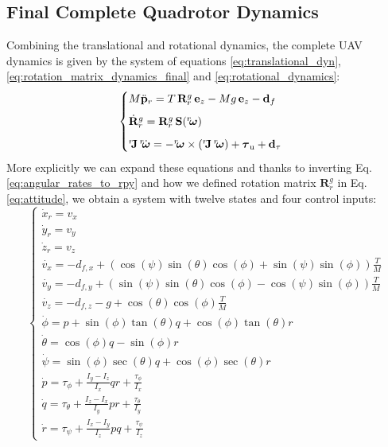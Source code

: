 \subsection{Final Complete Quadrotor Dynamics}
Combining the translational and rotational dynamics, the complete UAV dynamics is given by the system of equations
\ref{eq:translational_dyn}, \ref{eq:rotation_matrix_dynamics_final} and \ref{eq:rotational_dynamics}:
\begin{equation}
\begin{cases}
    M \ddot{\mathbf{p}}_r = T \, \mathbf{R}_r^g \, \mathbf{e}_z - M g \, \mathbf{e}_z - \mathbf{d}_f \\[6pt]
    \dot{\mathbf{R}}_r^g = \mathbf{R}_r^g \, \mathbf{S}({}^r\mkern-4mu\boldsymbol{\omega}) \\[6pt]
    {}^r\mkern-4mu\mathbf{J} \, {}^r\mkern-4mu\dot{\boldsymbol{\omega}} = 
    - {}^r\mkern-4mu\boldsymbol{\omega} \times 
    ({}^r\mkern-4mu\mathbf{J} \, {}^r\mkern-4mu\boldsymbol{\omega}) + \boldsymbol{\tau}_{\text{u}} + \mathbf{d}_{\tau}   
\end{cases}
\label{eq:final_model}
\end{equation}
More explicitly we can expand these equations and thanks to inverting Eq.\ref{eq:angular_rates_to_rpy}
and how we defined rotation matrix $\mathbf{R}_r^g$ in Eq.\ref{eq:attitude}, we obtain
a system with twelve states and four control inputs:
{\large
\begin{equation}
    \begin{cases}
        \dot{x}_r = v_x \\[6pt]
        \dot{y}_r = v_y \\[6pt]
        \dot{z}_r = v_z \\[6pt]
        \dot{v_x} = -d_{f,x} + (\cos(\psi) \sin(\theta) \cos(\phi) + \sin(\psi) \sin(\phi)) \frac{T}{M} \\[6pt]
        \dot{v_y} = -d_{f,y} + (\sin(\psi) \sin(\theta) \cos(\phi) - \cos(\psi) \sin(\phi)) \frac{T}{M} \\[6pt]
        \dot{v_z} = -d_{f,z} - g + \cos(\theta) \cos(\phi) \frac{T}{M} \\[6pt]
        \dot{\phi} = p + \sin(\phi) \tan(\theta) q + \cos(\phi) \tan(\theta) r \\[6pt]
        \dot{\theta} = \cos(\phi) q - \sin(\phi) r \\[6pt]
        \dot{\psi} = \sin(\phi) \sec(\theta) q + \cos(\phi) \sec(\theta) r \\[6pt]
        \dot{p} = \tau_{\phi} + \frac{I_y - I_z}{I_x} qr + \frac{\tau_\phi}{I_x} \\[8pt]
        \dot{q} = \tau_{\theta} + \frac{I_z - I_x}{I_y} pr + \frac{\tau_\theta}{I_y} \\[8pt]
        \dot{r} = \tau_{\psi} + \frac{I_x - I_y}{I_z} pq + \frac{\tau_\psi}{I_z}
    \end{cases}
    \label{eq:final_model_more}
\end{equation}}
